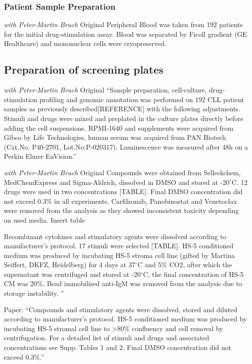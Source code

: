 \documentclass[11pt, a4paper, twosided]{book}
\begin{document}
\hypertarget{patient-sample-preparation}{%
\subsubsection{Patient Sample Preparation}\label{patient-sample-preparation}}

\emph{with Peter-Martin Bruch} Original
Peripheral Blood was taken from 192 patients for the initial drug-stimulation assay. Blood was separated by Ficoll gradient (GE Healthcare) and mononuclear cells were cryopreserved.

\hypertarget{preparation-of-screening-plates}{%
\subsection{Preparation of screening plates}\label{preparation-of-screening-plates}}

\emph{with Peter-Martin Bruch} Original
``Sample preparation, cell-culture, drug-stimulation profiling and genomic annotation was performed on 192 CLL patient samples as previously described{[}REFERENCE{]} with the following adjustments. Stimuli and drugs were mixed and preplated in the culture plates directly before adding the cell suspensions. RPMI-1640 and supplements were acquired from Gibco by Life Technologies, human serum was acquired from PAN Biotech (Cat.No. P40-2701, Lot.No:P-020317). Luminescence was measured after 48h on a Perkin Elmer EnVision.''

\emph{with Peter-Martin Bruch} Original
Compounds were obtained from Selleckchem, MedChemExpress and Sigma-Aldrich, dissolved in DMSO and stored at -\(20^\circ\)C. 12 drugs were used in two concentrations {[}TABLE{]}. Final DMSO concentration did not exceed 0.3\% in all experiments. Carfilzomib, Panobinostat and Venetoclax were removed from the analysis as they showed inconsistent toxicity depending on used media.
Insert table

Recombinant cytokines and stimulatory agents were dissolved according to manufacturer's protocol. 17 stimuli were selected {[}TABLE{]}. HS-5 conditioned medium was produced by incubating HS-5 stroma cell line (gifted by Martina Seiffert, DKFZ, Heidelberg) for 4 days at 37\(^\circ\)C and 5\% CO2, after which the supernatant was centrifuged and stored at -20\(^\circ\)C, the final concentration of HS-5 CM was 20\%. Bead immobilised anti-IgM was removed from the analysis due to storage instability. ''

Paper:
``Compounds and stimulatory agents were dissolved, stored and diluted according to manufacturer's protocol. HS-5 conditioned medium was produced by incubating HS-5 stromal cell line to \textgreater80\% confluency and cell removal by centrifugation. For a detailed list of stimuli and drugs and associated concentrations see Supp. Tables 1 and 2. Final DMSO concentration did not exceed 0.3\%.''
\end{document}
